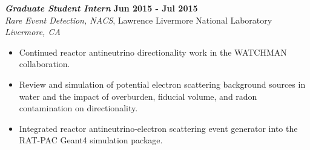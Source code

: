 {\sl\bf Graduate Student Intern} \hfill {\bf Jun 2015 - Jul 2015} \\
{\sl Rare Event Detection, NACS}, Lawrence Livermore National Laboratory \hfill {\sl Livermore, CA} \\[-2.8ex]
\vspace{2pt}
\begin{itemize}[leftmargin=4ex] \itemsep -2pt
\item Continued reactor antineutrino directionality work in the WATCHMAN collaboration.
\item Review and simulation of potential electron scattering background sources in water and the impact of overburden, fiducial volume, and radon contamination on directionality.
\item Integrated reactor antineutrino-electron scattering event generator into the RAT-PAC Geant4 simulation package.
\end{itemize} 

 
